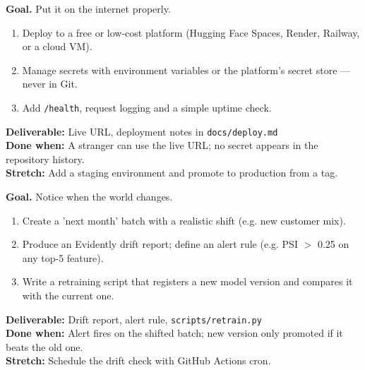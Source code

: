 \begin{tcolorbox}[enhanced,breakable,colback=white,colframe=sun,boxrule=0.8pt,arc=2pt,left=7pt,right=7pt,top=4pt,bottom=4pt,
  title={\bfseries Tuesday --- Cloud deployment\hfill\normalfont\small 3 h},coltitle=white,colbacktitle=sun,fonttitle=\small]
\textbf{Goal.} Put it on the internet properly.
\begin{enumerate}[itemsep=1pt,topsep=2pt]
  \item Deploy to a free or low-cost platform (Hugging Face Spaces, Render, Railway, or a cloud VM).
  \item Manage secrets with environment variables or the platform's secret store --- never in Git.
  \item Add \texttt{/health}, request logging and a simple uptime check.
\end{enumerate}
\textbf{\color{dataC}Deliverable:} Live URL, deployment notes in \texttt{docs/deploy.md}\\
\textbf{\color{navy}Done when:} A stranger can use the live URL; no secret appears in the repository history.\\
\textbf{\color{skillC}Stretch:} Add a staging environment and promote to production from a tag.
\end{tcolorbox}

\begin{tcolorbox}[enhanced,breakable,colback=white,colframe=sun,boxrule=0.8pt,arc=2pt,left=7pt,right=7pt,top=4pt,bottom=4pt,
  title={\bfseries Wednesday --- Monitoring, drift and retraining\hfill\normalfont\small 3 h},coltitle=white,colbacktitle=sun,fonttitle=\small]
\textbf{Goal.} Notice when the world changes.
\begin{enumerate}[itemsep=1pt,topsep=2pt]
  \item Create a 'next month' batch with a realistic shift (e.g. new customer mix).
  \item Produce an Evidently drift report; define an alert rule (e.g. PSI $>$ 0.25 on any top-5 feature).
  \item Write a retraining script that registers a new model version and compares it with the current one.
\end{enumerate}
\textbf{\color{dataC}Deliverable:} Drift report, alert rule, \texttt{scripts/retrain.py}\\
\textbf{\color{navy}Done when:} Alert fires on the shifted batch; new version only promoted if it beats the old one.\\
\textbf{\color{skillC}Stretch:} Schedule the drift check with GitHub Actions cron.
\end{tcolorbox}

